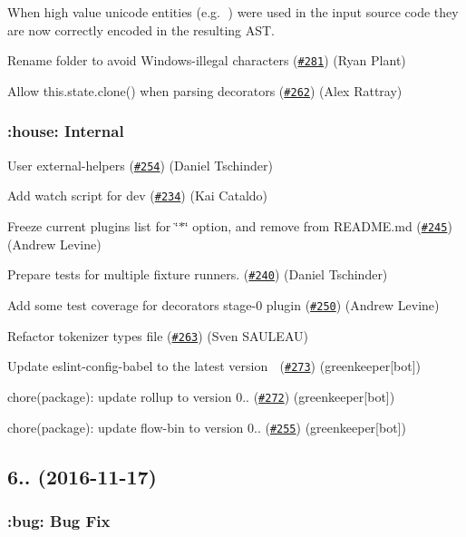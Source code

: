 When high value unicode entities (e.\+g. 💩) were used in the input source code they are now correctly encoded in the resulting A\+ST.

Rename folder to avoid Windows-\/illegal characters (\href{https://github.com/babel/babylon/pull/281}{\tt \#281}) (Ryan Plant)

Allow this.\+state.\+clone() when parsing decorators (\href{https://github.com/babel/babylon/pull/262}{\tt \#262}) (Alex Rattray)

\subsubsection*{\+:house\+: Internal}

User external-\/helpers (\href{https://github.com/babel/babylon/pull/254}{\tt \#254}) (Daniel Tschinder)

Add watch script for dev (\href{https://github.com/babel/babylon/pull/234}{\tt \#234}) (Kai Cataldo)

Freeze current plugins list for \char`\"{}$\ast$\char`\"{} option, and remove from R\+E\+A\+D\+M\+E.\+md (\href{https://github.com/babel/babylon/pull/245}{\tt \#245}) (Andrew Levine)

Prepare tests for multiple fixture runners. (\href{https://github.com/babel/babylon/pull/240}{\tt \#240}) (Daniel Tschinder)

Add some test coverage for decorators stage-\/0 plugin (\href{https://github.com/babel/babylon/pull/250}{\tt \#250}) (Andrew Levine)

Refactor tokenizer types file (\href{https://github.com/babel/babylon/pull/263}{\tt \#263}) (Sven S\+A\+U\+L\+E\+AU)

Update eslint-\/config-\/babel to the latest version 🚀 (\href{https://github.com/babel/babylon/pull/273}{\tt \#273}) (greenkeeper\mbox{[}bot\mbox{]})

chore(package)\+: update rollup to version 0.. (\href{https://github.com/babel/babylon/pull/272}{\tt \#272}) (greenkeeper\mbox{[}bot\mbox{]})

chore(package)\+: update flow-\/bin to version 0.. (\href{https://github.com/babel/babylon/pull/255}{\tt \#255}) (greenkeeper\mbox{[}bot\mbox{]})

\subsection*{6.. (2016-\/11-\/17)}

\subsubsection*{\+:bug\+: Bug Fix}

